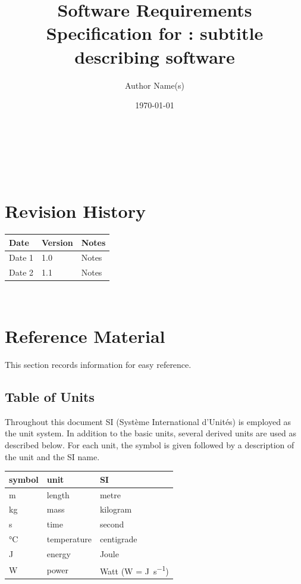 \documentclass[12pt]{article}
\begin{document}
\title{Software Requirements Specification for \progname: subtitle describing software} 
\author{Author Name(s)}
\date{\today}
	
\maketitle

~\newpage


\tableofcontents

~\newpage

\section*{Revision History}

\begin{tabularx}{\textwidth}{p{3cm}p{2cm}X}
\toprule {\bf Date} & {\bf Version} & {\bf Notes}\\
\midrule
Date 1 & 1.0 & Notes\\
Date 2 & 1.1 & Notes\\
\bottomrule
\end{tabularx}

~\newpage

\section{Reference Material}

This section records information for easy reference.

\subsection{Table of Units}

Throughout this document SI (Syst\`{e}me International d'Unit\'{e}s) is employed
as the unit system.  In addition to the basic units, several derived units are
used as described below.  For each unit, the symbol is given followed by a
description of the unit and the SI name.
~\newline

\renewcommand{\arraystretch}{1.2}
  \noindent \begin{tabular}{l l l} 
    \toprule		
    \textbf{symbol} & \textbf{unit} & \textbf{SI}\\
    \midrule 
    \si{\metre} & length & metre\\
    \si{\kilogram} & mass	& kilogram\\
    \si{\second} & time & second\\
    \si{\celsius} & temperature & centigrade\\
    \si{\joule} & energy & Joule\\
    \si{\watt} & power & Watt (W = \si{\joule\per\second})\\
    \bottomrule
  \end{tabular}
\end{document}
